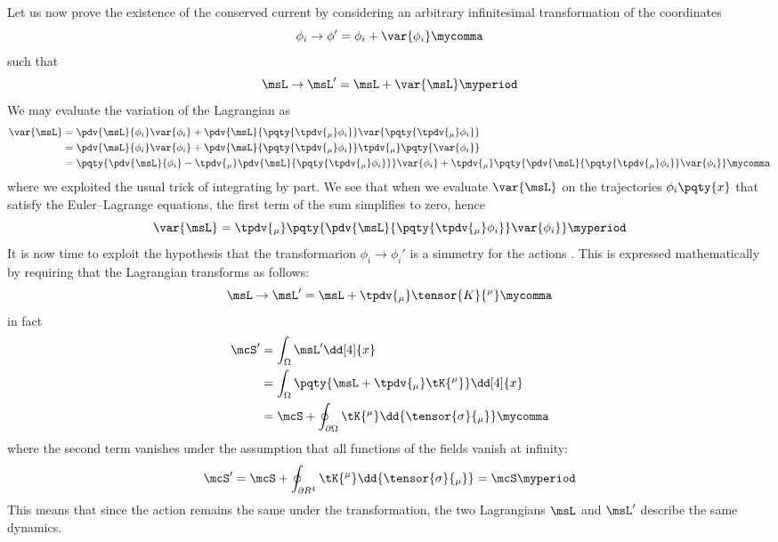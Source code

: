         Let us now prove the existence of the conserved current by considering an arbitrary infinitesimal transformation of the coordinates
        \begin{equation*}
            \phi_i \to \phi' = \phi_i + \var{\phi_i}
            \mycomma
        \end{equation*}
        such that
        \begin{equation*}
            \msL \to \msL' = \msL + \var{\msL}
            \myperiod
        \end{equation*}
        We may evaluate the variation of the Lagrangian as
        \begin{align*}
            \var{\msL}
            &= \pdv{\msL}{\phi_i} \var{\phi_i} + \pdv{\msL}{\pqty{\tpdv{_\mu}\phi_i}} \var{\pqty{\tpdv{_\mu}\phi_i}} \\
            &= \pdv{\msL}{\phi_i} \var{\phi_i} + \pdv{\msL}{\pqty{\tpdv{_\mu}\phi_i}} \tpdv{_\mu}\pqty{\var{\phi_i}} \\
            &= \pqty{\pdv{\msL}{\phi_i} - \tpdv{_\mu}\pdv{\msL}{\pqty{\tpdv{_\mu}\phi_i}}} \var{\phi_i} + \tpdv{_\mu}\pqty{\pdv{\msL}{\pqty{\tpdv{_\mu}\phi_i}} \var{\phi_i}}
            \mycomma
        \end{align*}
        where we exploited the usual trick of integrating by part.
        We see that when we evaluate $\var{\msL}$ on the trajectories $\phi_i\pqty{x}$ that satisfy the Euler--Lagrange equations, the first term of the sum simplifies to zero, hence
        \begin{equation}
            \label{eq:noether-dL-1}
            \var{\msL} = \tpdv{_\mu}\pqty{\pdv{\msL}{\pqty{\tpdv{_\mu}\phi_i}} \var{\phi_i}}
            \myperiod
        \end{equation}
        It is now time to exploit the hypothesis that the transformarion $\phi_i \to \phi_i'$ is a simmetry for the actions \mcS.
        This is expressed mathematically by requiring that the Lagrangian transforms as follows:
        \begin{equation*}
                \msL \to \msL' = \msL + \tpdv{_\mu}\tensor{K}{^\mu}
                \mycomma
        \end{equation*}
        in fact
        \begin{align*}
                \mcS' &= \int\nolimits_\Omega \msL' \dd[4]{x} \\
                &= \int\nolimits_\Omega \pqty{\msL + \tpdv{_\mu}\tK{^\mu}} \dd[4]{x} \\
                &= \mcS + \oint\nolimits_{\partial\Omega} \tK{^\mu} \dd{\tensor{\sigma}{_\mu}}
                \mycomma
        \end{align*}
        where the second term vanishes under the assumption that all functions of the fields vanish at infinity:
        \begin{equation}
            \label{eq:noether-dL-2}
            \mcS' = \mcS + \oint\nolimits_{\partial R^4} \tK{^\mu} \dd{\tensor{\sigma}{_\mu}}
            = \mcS
            \myperiod
        \end{equation}
        This means that since the action remains the same under the transformation, the two Lagrangians $\msL$ and $\msL'$ describe the same dynamics.
        
